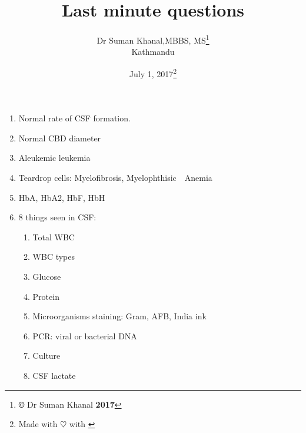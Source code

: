 \documentclass[12pt]{article}
\title{Last minute questions}
\author{Dr Suman Khanal,MBBS, MS\footnote{\textbf{\copyright} Dr Suman Khanal \textbf{2017}}\\ Kathmandu}
\date{July 1, 2017\footnote{Made with $\heartsuit$ with \href{https://www.latex-project.org/}{\LaTeXe}}}
\begin{document}
\maketitle



\begin{enumerate}
	\item Normal rate of CSF formation.
	\item Normal CBD diameter
	\item Aleukemic leukemia
	\item Teardrop cells: Myelofibrosis, Myelophthisic Anemia
	\item HbA, HbA2, HbF, HbH
	\item 8 things seen in CSF:
	\begin{enumerate}
	\item Total WBC
	\item WBC types
	\item Glucose
	\item Protein
	\item Microorganisms staining: Gram, AFB, India ink
	\item PCR: viral or bacterial DNA
	\item Culture
	\item CSF lactate
	\end{enumerate}
	
	
\end{enumerate}
\end{document}

